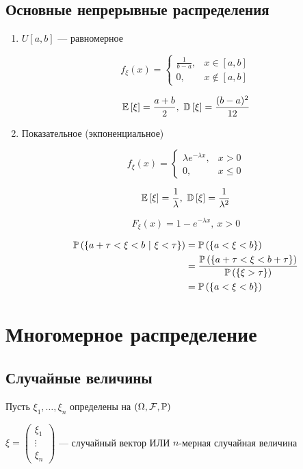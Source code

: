 \documentclass[a4paper, 10pt]{article}
\begin{document}
\subsection{Основные непрерывные распределения}
\begin{enumerate}
    \item $U[a, b]$ — равномерное

    $$f_\xi(x)=\begin{cases}
        \frac{1}{b-a}, & x\in[a, b]\\
        0, & x\not\in[a, b]
    \end{cases}$$
    
    $$\matwait{\xi}=\frac{a+b}{2},\ \dispersia{\xi}=\frac{(b-a)^2}{12}$$

    \item Показательное (экпоненциальное)

    $$f_\xi(x)=\begin{cases}
        \lambda e^{-\lambda x}, & x>0\\
        0, & x\leqslant 0
    \end{cases}$$
    
    $$\matwait{\xi}=\frac{1}{\lambda},\ \dispersia{\xi}=\frac{1}{\lambda^2}$$
    
    $$F_\xi(x)=1-e^{-\lambda x},\ x>0$$
    
    \begin{equation*}
        \begin{aligned}
            \prob{a+\tau<\xi<b\ |\ \xi<\tau}&=\prob{a<\xi<b}\\
            &=\frac{\prob{a+\tau<\xi<b+\tau}}{\prob{\xi>\tau}}\\
            &=\prob{a<\xi<b}
        \end{aligned}
    \end{equation*}
    
\end{enumerate}


\newpage
\section{Многомерное распределение}
\subsection{Случайные величины}
Пусть $\xi_1,\ldots,\xi_n$ определены на $(\Omega,\mathcal{F},\mathbb{P})$

 $\xi=\begin{pmatrix}
    \xi_1\\
    \vdots\\
    \xi_n
\end{pmatrix}$ — случайный вектор ИЛИ $n$-мерная случайная величина
\end{document}
